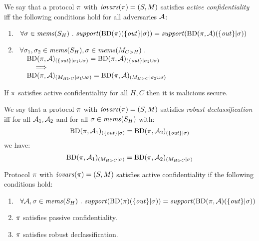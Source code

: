 \begin{definition}
  We say that a protocol $\pi$ with $\mathit{iovars}(\pi) = (S,M)$ satisfies \emph{active confidentiality} iff the following conditions hold
  for all adversaries $\mathcal{A}$:
  \begin{enumerate}
  \item $\ \,\forall \store \in \mems(S_H) \ .\ \support(\progtt(\prog)(\{ \outv \}|\store)) =
    \support(\progtt(\prog,\adversary)(\{ \outv \}|\store))$
  \item $\begin{array}[t]{l}\forall \sigma_1, \sigma_2 \in \mathit{mems}(S_H), \sigma \in \mathit{mems}(M_{C \rhd H})\ . \\
    \quad
    \mathrm{BD}(\pi,\mathcal{A})_{({\{ \mathit{out} \}}|{\sigma_1 \cup \sigma})} =
    \mathrm{BD}(\pi,\mathcal{A})_{({\{ \mathit{out} \}}|{\sigma_2 \cup \sigma})} \\
    \qquad \implies\\
    \quad
    \mathrm{BD}(\pi,\mathcal{A})_{({M_{H \rhd C}}|{\sigma_1 \cup \sigma})} =
    \mathrm{BD}(\pi,\mathcal{A})_{({M_{H \rhd C}}|{\sigma_2 \cup \sigma})}\end{array}$
  \end{enumerate}
\end{definition}

\begin{theorem}
  If $\pi$ satisfies active confidentiality for all $H,C$ then it is malicious secure.
\end{theorem}

\begin{definition}
  We say that a protocol $\pi$ with $\mathit{iovars}(\pi) = (S,M)$ satisfies \emph{robust declassification} iff for all $\mathcal{A}_1,\mathcal{A}_2$ and
  for all $\sigma \in \mathit{mems}(S_H)$ with: %
  $$
  \mathrm{BD}(\pi,\mathcal{A}_1)_{({\{ \mathit{out} \}}|{\sigma})} =
  \mathrm{BD}(\pi,\mathcal{A}_2)_{({\{ \mathit{out} \}}|{\sigma})}
  $$
  we have:
  $$
  \mathrm{BD}(\pi,\mathcal{A}_1)_{({M_{H \rhd C}}|{\sigma})} =
  \mathrm{BD}(\pi,\mathcal{A}_2)_{({M_{H \rhd C}}|{\sigma})}
  $$
\end{definition}

\begin{theorem}
  Protocol $\pi$ with $\mathit{iovars}(\pi) = (S,M)$ satisfies active confidentiality if the following conditions hold:
  \begin{enumerate}
  \item $\ \,\forall \mathcal{A}, \sigma \in \mathit{mems}(S_H) \ .\ \mathit{support}(\mathrm{BD}(\pi)(\{ \mathit{out} \}|\sigma)) =
    \mathit{support}(\mathrm{BD}(\pi,\mathcal{A})(\{ \mathit{out} \}|\sigma))$
  \item $\pi$ satisfies passive confidentiality.
  \item $\pi$ satisfies robust declassification.
  \end{enumerate}
\end{theorem}

